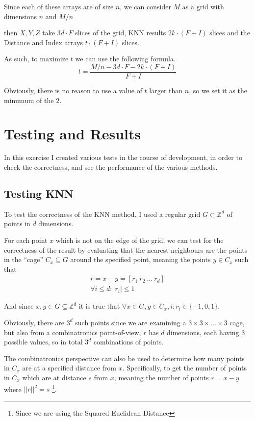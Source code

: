 \documentclass[10pt, a4paper]{article}
\begin{document}
Since each of these arrays are of size $n$, we can consider $M$ as a grid with dimensions $n$ and $M/n$

then $X, Y, Z$ take $3d \cdot F$ slices of the grid, KNN results $2k \cdot (F + I)$ slices and
the Distance and Index arrays $t \cdot (F + I)$ slices.

As such, to maximize $t$ we can use the following formula. 
\begin{equation}
	t = \frac{M/n - 3d \cdot F - 2k \cdot(F + I)}{F + I}
\end{equation}

Obviously, there is no reason to use a value of $t$ larger than $n$, so we set it as the minumum of the 2.

\section{Testing and Results}
In this exercise I created various tests in the course of development, in order to check the correctness,
and see the performance of the various methods. 

\subsection{Testing KNN}
To test the correctness of the KNN method, I used a regular grid $G \subset \mathbb{Z}^d$ of points 
in $d$ dimensions. 

For each point $x$ which is not on the edge of the grid, we can test for the correctness of the result by 
evaluating that the nearest neighbours are the points in the ``cage'' $C_x \subseteq G$ around the
specified point, meaning the points $y \in C_x$ such that 
\begin{gather*}
r = x - y = \left[ r_1 \  r_2 \ \ldots \ r_d \right] \\
\forall i \leq d: |r_i| \leq 1
\end{gather*}

And since $x, y \in G \subseteq \mathbb{Z}^d$ it is true that 
$\forall x \in G ,y \in C_x, i: r_i \in \{-1, 0, 1\}$.

Obviously, there are $3^d$ such points since we are examining a $3 \times 3 \times \ldots \times 3$ cage,
but also from a combinatronics point-of-view, $r$ has $d$ dimensions, each having $3$ possible values, so 
in total $3^d$ combinations of points. 

The combinatronics perspective can also be used to determine how many points in $C_x$ are at a specified
distance from $x$. Specifically, to get the number of points in $C_x$ which are at distance $s$ from $x$, 
meaning the number of points $r = x - y$ where $||r||^2 = s$ \footnote{Since we are using the Squared Euclidean 
Distance}. 
\end{document}
